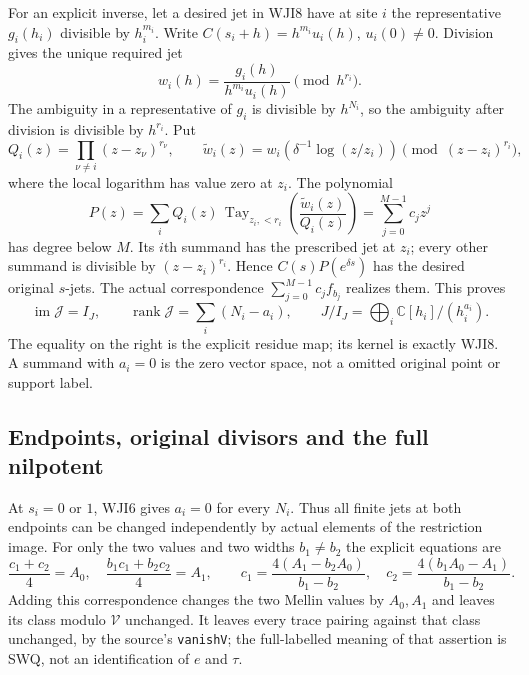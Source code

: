 For an explicit inverse, let a desired jet in WJI8 have at site
$i$ the representative $g_i(h_i)$ divisible by $h_i^{m_i}$.
Write $C(s_i+h)=h^{m_i}u_i(h)$, $u_i(0)\ne0$.
Division gives the unique required jet
\begin{equation}\tag{WJI11}
 w_i(h)=\frac{g_i(h)}{h^{m_i}u_i(h)}
                           \pmod {h^{r_i}}.
\end{equation}
The ambiguity in a representative of $g_i$ is divisible by
$h^{N_i}$, so the ambiguity after division is divisible by
$h^{r_i}$. Put
\[
 Q_i(z)=\prod_{\nu\ne i}(z-z_\nu)^{r_\nu},\qquad
 \widetilde w_i(z)=
       w_i\!\left(\delta^{-1}\log(z/z_i)\right)
                  \pmod{(z-z_i)^{r_i}},
\]
where the local logarithm has value zero at $z_i$. The polynomial
\begin{equation}\tag{WJI12}
 P(z)=\sum_i Q_i(z)\,
    \operatorname{Tay}_{z_i,<r_i}
             \left(\frac{\widetilde w_i(z)}{Q_i(z)}\right)
       =\sum_{j=0}^{M-1}c_jz^j
\end{equation}
has degree below $M$. Its $i$th summand has the prescribed
jet at $z_i$; every other summand is divisible by
$(z-z_i)^{r_i}$. Hence $C(s)P(e^{\delta s})$ has the
desired original $s$-jets. The actual correspondence
$\sum_{j=0}^{M-1}c_j f_{b_j}$ realizes them. This proves
\begin{equation}\tag{WJI13}
 \operatorname{im}\mathcal J=I_J,\qquad
 \operatorname{rank}\mathcal J=\sum_i(N_i-a_i),\qquad
 J/I_J=\bigoplus_i\mathbb C[h_i]/(h_i^{a_i}).
\end{equation}
The equality on the right is the explicit residue map; its
kernel is exactly WJI8. A summand with $a_i=0$ is the zero
vector space, not a omitted original point or support label.

\subsection{Endpoints, original divisors and the full nilpotent}

At $s_i=0$ or $1$, WJI6 gives $a_i=0$ for every $N_i$.
Thus all finite jets at both endpoints can be changed
independently by actual elements of the restriction image.
For only the two values and two widths $b_1\ne b_2$ the
explicit equations are
\begin{equation}\tag{WJI14}
 \frac{c_1+c_2}{4}=A_0,\quad
 \frac{b_1c_1+b_2c_2}{4}=A_1,\qquad
 c_1=\frac{4(A_1-b_2A_0)}{b_1-b_2},\quad
 c_2=\frac{4(b_1A_0-A_1)}{b_1-b_2}.
\end{equation}
Adding this correspondence changes the two Mellin values by
$A_0,A_1$ and leaves its class modulo $\mathcal V$ unchanged.
It leaves every trace pairing against that class unchanged,
by the source's \texttt{vanishV}; the full-labelled meaning
of that assertion is SWQ, not an identification of $e$ and $\tau$.

